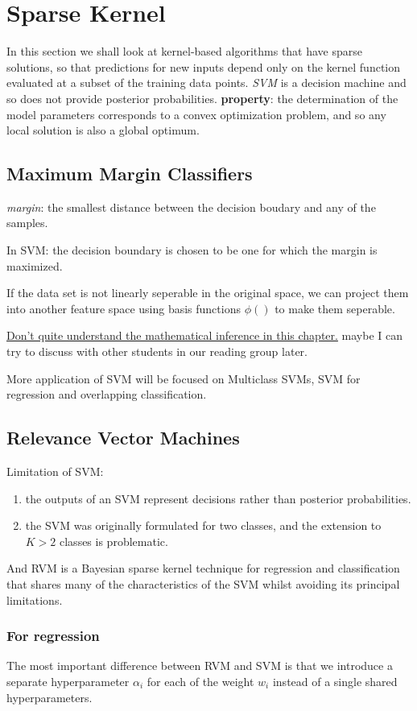 \documentclass[a4paper]{book}
\begin{document}
\section{Sparse Kernel}
In this section we shall look at kernel-based algorithms that have sparse solutions, so that predictions for new inputs depend only on the kernel function evaluated at a subset of the training data points.\newline
\emph{SVM} is a decision machine and so does not provide posterior probabilities.
\textbf{property}: the  determination of the model parameters corresponds to a convex optimization problem, and so any local solution is also a global optimum.
\subsection{Maximum Margin Classifiers}
\emph{margin}: the smallest distance between the decision boudary and any of the samples.

In SVM: the decision boundary is chosen to be one for which the margin is maximized.

If the data set is not linearly seperable in the original space, we can project them into another feature space using basis functions $\phi()$  to make them seperable.

\uline{Don't quite understand the mathematical inference in this chapter.}  maybe I can try to discuss with other students in our reading group later.

More application of SVM will be focused on Multiclass SVMs, SVM for regression and overlapping classification.
\subsection{Relevance Vector Machines}
Limitation of SVM: 
\begin{enumerate}
  \item the outputs of an SVM represent decisions rather than posterior probabilities.
  \item  the SVM was originally formulated for two classes, and the extension to $K > 2$ classes is problematic.
\end{enumerate}

And RVM is a Bayesian sparse kernel technique for regression and classification that shares many of the characteristics of the SVM whilst avoiding its principal limitations.

\subsubsection{For regression}
The most important difference between RVM and SVM is that we introduce a separate hyperparameter $\alpha_i$ for each of the weight $w_i$ instead of a single shared hyperparameters.
\end{document}
